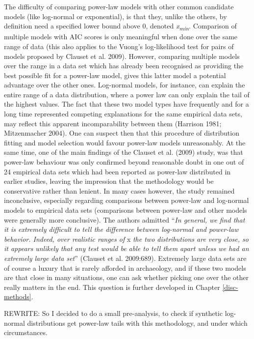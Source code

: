 \documentclass[
  12pt,
]{book}
\begin{document}
The difficulty of comparing power-law models with other common candidate models (like log-normal or exponential), is that they, unlike the others, by definition need a specified lower bound above 0, denoted \emph{x\textsubscript{min}}. Comparison of multiple models with AIC scores is only meaningful when done over the same range of data (this also applies to the Vuong's log-likelihood test for pairs of models proposed by Clauset et al. 2009). However, comparing multiple models over the range in a data set which has already been recognised as providing the best possible fit for a power-law model, gives this latter model a potential advantage over the other ones. Log-normal models, for instance, can explain the entire range of a data distribution, where a power law can only explain the tail of the highest values. The fact that these two model types have frequently and for a long time represented competing explanations for the same empirical data sets, may reflect this apparent incomparability between them (Harrison 1981; Mitzenmacher 2004). One can suspect then that this procedure of distribution fitting and model selection would favour power-law models unreasonably. At the same time, one of the main findings of the Clauset et al. (2009) study, was that power-law behaviour was only confirmed beyond reasonable doubt in one out of 24 empirical data sets which had been reported as power-law distributed in earlier studies, leaving the impression that the methodology would be conservative rather than lenient. In many cases however, the study remained inconclusive, especially regarding comparisons between power-law and log-normal models to empirical data sets (comparisons between power-law and other models were generally more conclusive). The authors admitted ``\emph{In general, we find that it is extremely difficult to tell the difference between log-normal and power-law behavior. Indeed, over realistic ranges of} x \emph{the two distributions are very close, so it appears unlikely that any test would be able to tell them apart unless we had an extremely large data set}'' (Clauset et al. 2009:689). Extremely large data sets are of course a luxury that is rarely afforded in archaeology, and if these two models are that close in many situations, one can ask whether picking one over the other really matters in the end. This question is further developed in Chapter \ref{disc-methods}.

REWRITE: So I decided to do a small pre-analysis, to check if synthetic log-normal distributions get power-law tails with this methodology, and under which circumstances.
\end{document}
